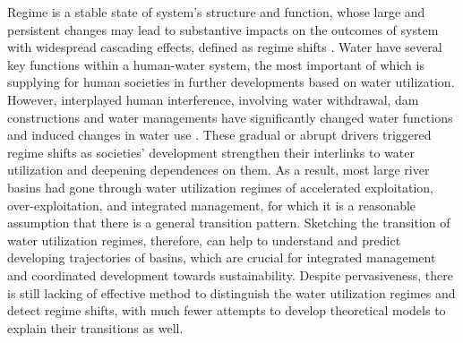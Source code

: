 \documentclass[9pt, twocolumn, twoside, lineno]{pnas-new}
\begin{document}
Regime is a stable state of system’s structure and function, whose large and persistent changes may lead to substantive impacts on the outcomes of system with widespread cascading effects, defined as regime shifts \cite{rochaCascadingRegimeShifts2018, schefferCatastrophicRegimeShifts2003, schefferCatastrophicShiftsEcosystems2001}.
Water have several key functions within a human-water system, the most important of which is supplying for human societies in further developments based on water utilization. 
However, interplayed human interference, involving water withdrawal, dam constructions and water managements have significantly changed water functions and induced changes in water use
\cite{falkenmarkUnderstandingWaterResilience2019}.
These gradual or abrupt drivers triggered regime shifts as societies' development strengthen their interlinks to water utilization and deepening dependences on them.
As a result, most large river basins had gone through water utilization regimes of accelerated exploitation, over-exploitation, and integrated management, for which it is a reasonable assumption that there is a general transition pattern. 
Sketching the transition of water utilization regimes, therefore, can help to understand and predict developing trajectories of basins, which are crucial for integrated management and coordinated development towards sustainability.
Despite pervasiveness, there is still lacking of effective method to distinguish the water utilization regimes and detect regime shifts, with much fewer attempts to develop theoretical models to explain their transitions as well. 
\end{document}
